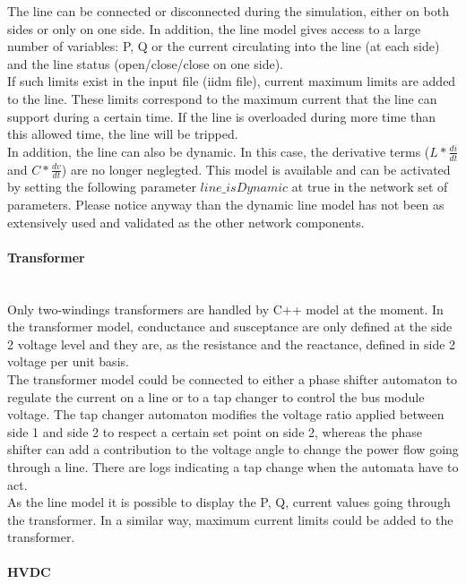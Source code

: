 \documentclass[a4paper, 12pt]{report}
\begin{document}
The line can be connected or disconnected during the simulation, either on both sides or only on one side. In addition, the line model gives access to a large number of variables: P, Q or the current circulating into the line (at each side) and the line status (open/close/close on one side). \\
If such limits exist in the input file (iidm file), current maximum limits are added to the line. These limits correspond to the maximum current that the line can support during a certain time. If the line is overloaded during more time than this allowed time, the line will be tripped. \\

In addition, the line can also be dynamic. In this case, the derivative terms ($L * \frac{di}{dt}$ and $C * \frac{dv}{dt}$) are no longer neglegted. This model is available and can be activated by setting the following parameter $line\_isDynamic$ at true in the network set of parameters. Please notice anyway than the dynamic line model has not been as extensively used and validated as the other network components.

\paragraph{Transformer}
~~\\

Only two-windings transformers are handled by \Dynawo C++ model at the moment. In the transformer model, conductance and susceptance are only defined at the side 2 voltage level and they are, as the resistance and the reactance, defined in side 2 voltage per unit basis. \\
The transformer model could be connected to either a phase shifter automaton to regulate the current on a line or to a tap changer to control the bus module voltage. The tap changer automaton modifies the voltage ratio applied between side 1 and side 2 to respect a certain set point on side 2, whereas the phase shifter can add a contribution to the voltage angle to change the power flow going through a line. There are logs indicating a tap change when the automata have to act. \\
As the line model it is possible to display the P, Q, current values going through the transformer. In a similar way, maximum current limits could be added to the transformer. \\

\paragraph{HVDC}
~~\\
\end{document}
